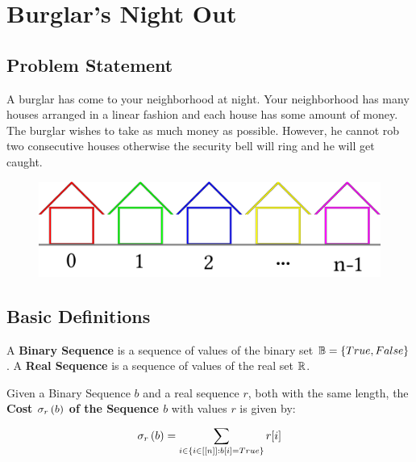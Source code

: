 \chapter{Burglar's Night Out}

\section{Problem Statement}

A burglar has come to your neighborhood at night. Your neighborhood has many houses arranged in a linear fashion and each house has some amount of money. The burglar wishes to take as much money as possible. However, he cannot rob two consecutive houses otherwise the security bell will ring and he will get caught.

\begin{figure}[H]
    \centering
    \includegraphics[width=\textwidth]{images/blurglars_night_out/houses.png}
\end{figure}

\section{Basic Definitions}

\newcommand{\binarySet}{\ensuremath{\mathbb{B}}}
\renewcommand{\cost}[2]{\ensuremath{\apply{\sigma_{#2}}{#1}}}

\begin{defn}
    A \textbf{Binary Sequence} is a sequence of values of the binary set $\binarySet = \Set{True, False}$.
    A \textbf{Real Sequence} is a sequence of values of the real set $\mathbb{R}$.
\end{defn}

\begin{defn}
    Given a Binary Sequence $b$ and a real sequence $r$, both with the same length, the \textbf{Cost $\cost{b}{r}$ of the Sequence $b$} with values $r$ is given by:
    \begin{equation}
        \cost{b}{r} = \Sum{i \in \SetOf{i \in \range{n}}{b[i] = True}}{}{r[i]}
    \end{equation}
\end{defn}

